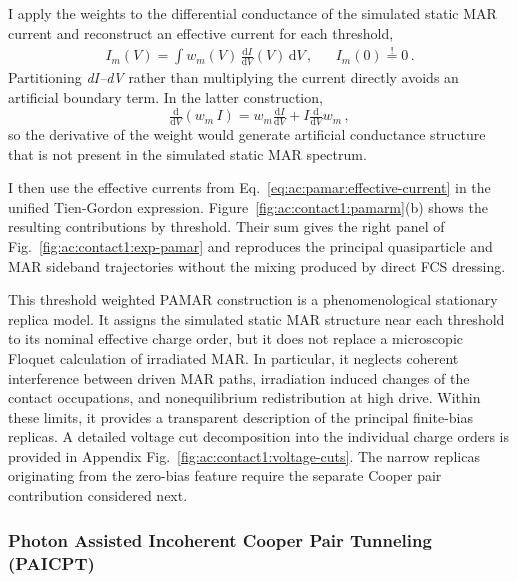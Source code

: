         I apply the weights to the differential conductance of the simulated static MAR current and reconstruct an effective current for each threshold,
        \begin{align}
            I_m(V) = \int w_m(V)\,\tfrac{\mathrm{d}I}{\mathrm{d}V}(V)\,\mathrm{d}V\,, &&
            I_m(0)\overset{!}{=}0\,.
            \label{eq:ac:pamar:effective-current}
        \end{align}
        Partitioning \textit{dI--dV} rather than multiplying the current directly avoids an artificial boundary term. In the latter construction,
        \begin{equation}
            \tfrac{\mathrm{d}}{\mathrm{d}V}\!\left(w_m\,I\right)
            =w_m\tfrac{\mathrm{d}I}{\mathrm{d}V}+I\tfrac{\mathrm{d}}{\mathrm{d}V}w_m\,,
            \label{eq:ac:pamar:current-weight-derivative}
        \end{equation}
        so the derivative of the weight would generate artificial conductance structure that is not present in the simulated static MAR spectrum.

        I then use the effective currents from Eq.~\eqref{eq:ac:pamar:effective-current} in the unified Tien-Gordon expression. Figure~\ref{fig:ac:contact1:pamarm}(b) shows the resulting contributions by threshold. Their sum gives the right panel of Fig.~\ref{fig:ac:contact1:exp-pamar} and reproduces the principal quasiparticle and MAR sideband trajectories without the mixing produced by direct FCS dressing.

        This threshold weighted PAMAR construction is a phenomenological stationary replica model. It assigns the simulated static MAR structure near each threshold to its nominal effective charge order, but it does not replace a microscopic Floquet calculation of irradiated MAR. In particular, it neglects coherent interference between driven MAR paths, irradiation induced changes of the contact occupations, and nonequilibrium redistribution at high drive. Within these limits, it provides a transparent description of the principal finite-bias replicas. A detailed voltage cut decomposition into the individual charge orders is provided in Appendix Fig.~\ref{fig:ac:contact1:voltage-cuts}. The narrow replicas originating from the zero-bias feature require the separate Cooper pair contribution considered next.

    \subsubsection*{Photon Assisted Incoherent Cooper Pair Tunneling (PAICPT)}


